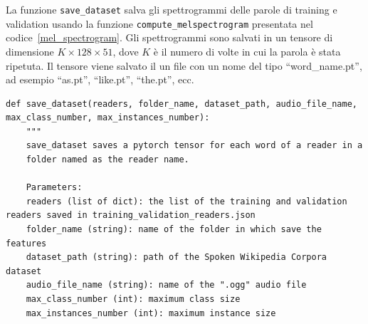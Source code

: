 \documentclass[12pt,a4paper,titlepage]{article}
\begin{document}
La funzione \texttt{save\_dataset} salva gli spettrogrammi delle parole di training e validation usando la funzione \texttt{compute\_melspectrogram} presentata nel codice~\ref{mel_spectrogram}. Gli spettrogrammi sono salvati in un tensore di dimensione $K \times 128 \times 51$, dove $K$ è il numero di volte in cui la parola è stata ripetuta. Il tensore viene salvato il un file con un nome del tipo ``word\_name.pt'', ad esempio ``as.pt'', ``like.pt'', ``the.pt'', ecc.

\begin{lstlisting}[language=iPython,firstnumber=10, caption=Funzione \texttt{save\_dataset}, label=save_dataset,captionpos=b]
def save_dataset(readers, folder_name, dataset_path, audio_file_name, max_class_number, max_instances_number):
    """
    save_dataset saves a pytorch tensor for each word of a reader in a
    folder named as the reader name.

    Parameters:
    readers (list of dict): the list of the training and validation readers saved in training_validation_readers.json
    folder_name (string): name of the folder in which save the features
    dataset_path (string): path of the Spoken Wikipedia Corpora dataset
    audio_file_name (string): name of the ".ogg" audio file 
    max_class_number (int): maximum class size
    max_instances_number (int): maximum instance size


\end{lstlisting}
\end{document}
